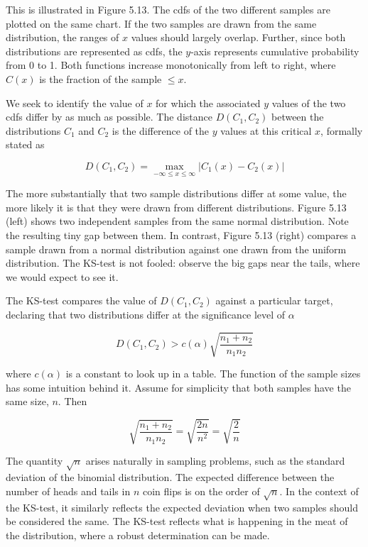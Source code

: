 \documentclass[10pt]{article}
\begin{document}
This is illustrated in Figure 5.13. The cdfs of the two different samples are plotted on the same chart. If the two samples are drawn from the same distribution, the ranges of $x$ values should largely overlap. Further, since both distributions are represented as cdfs, the $y$-axis represents cumulative probability from 0 to 1. Both functions increase monotonically from left to right, where $C(x)$ is the fraction of the sample $\leq x$.

We seek to identify the value of $x$ for which the associated $y$ values of the two cdfs differ by as much as possible. The distance $D(C_{1}, C_{2})$ between the distributions $C_{1}$ and $C_{2}$ is the difference of the $y$ values at this critical $x$, formally stated as

\[
D(C_{1}, C_{2})=\max_{-\infty \leq x \leq \infty}\left|C_{1}(x)-C_{2}(x)\right|
\]

The more substantially that two sample distributions differ at some value, the more likely it is that they were drawn from different distributions. Figure 5.13 (left) shows two independent samples from the same normal distribution. Note the resulting tiny gap between them. In contrast, Figure 5.13 (right) compares a sample drawn from a normal distribution against one drawn from the uniform distribution. The KS-test is not fooled: observe the big gaps near the tails, where we would expect to see it.

The KS-test compares the value of $D(C_{1}, C_{2})$ against a particular target, declaring that two distributions differ at the significance level of $\alpha$ 

\[
D(C_{1}, C_{2}) > c(\alpha) \sqrt{\frac{n_{1}+n_{2}}{n_{1} n_{2}}}
\]

where $c(\alpha)$ is a constant to look up in a table. The function of the sample sizes has some intuition behind it. Assume for simplicity that both samples have the same size, $n$. Then

\[
\sqrt{\frac{n_{1}+n_{2}}{n_{1} n_{2}}}=\sqrt{\frac{2n}{n^{2}}}=\sqrt{\frac{2}{n}}
\]

The quantity $\sqrt{n}$ arises naturally in sampling problems, such as the standard deviation of the binomial distribution. The expected difference between the number of heads and tails in $n$ coin flips is on the order of $\sqrt{n}$. In the context of the KS-test, it similarly reflects the expected deviation when two samples should be considered the same. The KS-test reflects what is happening in the meat of the distribution, where a robust determination can be made.
\end{document}
